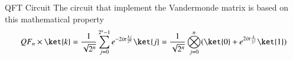 \begin{frame}{QFT Circuit}
The circuit that implement the Vandermonde matrix is based on this mathematical property\newline \newline
\begin{equation*}
    QF_n \times \ket{k} =  \frac{1}{\sqrt{2^n}} \sum_{j=0}^{2^{n}-1} e^{-2i\pi\frac{kj}{2^n}} \ket{j}
                        =  \frac{1}{\sqrt{2^n}} \bigotimes_{j=0}^{n}(\ket{0} + e^{2i\pi\frac{k}{2^j}} \ket{1} )
\end{equation*}
\begin{center}
\end{center}
\end{frame}

